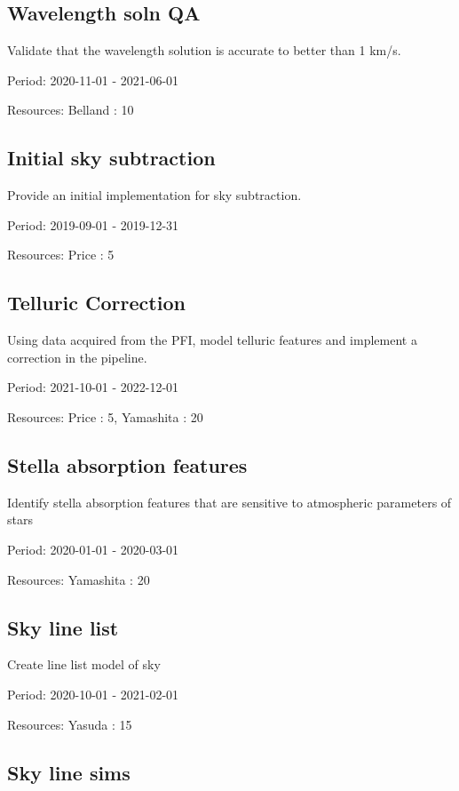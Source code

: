 \subsection{Wavelength soln QA}

Validate that the wavelength solution is accurate to better than 1 km/s.

Period: 2020-11-01 - 2021-06-01

Resources: Belland : 10

\subsection{Initial sky subtraction}

Provide an initial implementation for sky subtraction.

Period: 2019-09-01 - 2019-12-31

Resources: Price : 5

\subsection{Telluric Correction}

Using data acquired from the PFI, model telluric features and implement a correction in the pipeline.

Period: 2021-10-01 - 2022-12-01

Resources: Price : 5, Yamashita : 20

\subsection{Stella absorption features}

Identify stella absorption features that are sensitive to atmospheric parameters of stars

Period: 2020-01-01 - 2020-03-01

Resources: Yamashita : 20

\subsection{Sky line list}

Create line list model of sky

Period: 2020-10-01 - 2021-02-01

Resources: Yasuda : 15

\subsection{Sky line sims}

